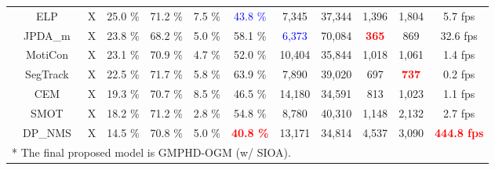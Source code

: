 \documentclass[journal]{IEEEtran}
\begin{document}
\begin{table*}[t]
\begin{tabular}{|c|c|c|ccccccccc|}
            & \footnotesize{ELP~\cite{elp}} &  \footnotesize{X}
            & \footnotesize{25.0 \%} &  \footnotesize{71.2 \%} &  \footnotesize{7.5 \%} &  \footnotesize{\textcolor{blue}{43.8 \%}} &  \footnotesize{7,345} &  \footnotesize{37,344} &  \footnotesize{1,396} &  \footnotesize{1,804} &  \footnotesize{5.7 fps}  \\
            
            &\footnotesize{JPDA\_m~\cite{jpdam}} &  \footnotesize{X}
            & \footnotesize{23.8 \%} &  \footnotesize{68.2 \%} &  \footnotesize{5.0 \%} &  \footnotesize{58.1 \%} &  \footnotesize{\textcolor{blue}{6,373}} &  \footnotesize{70,084} &  \footnotesize{\textbf{\textcolor{red}{365}}} &  \footnotesize{869} &  \footnotesize{32.6 fps}  \\
            
             &\footnotesize{MotiCon~\cite{moticon}} &  \footnotesize{X}
             & \footnotesize{23.1 \%} &  \footnotesize{70.9 \%} &  \footnotesize{4.7 \%} &  \footnotesize{52.0 \%} &  \footnotesize{10,404} &  \footnotesize{35,844} &  \footnotesize{1,018} &  \footnotesize{1,061} &  \footnotesize{1.4 fps}  \\
            
            &\footnotesize{SegTrack~\cite{segtrack}} &  \footnotesize{X}
            & \footnotesize{22.5 \%} &  \footnotesize{71.7 \%} &  \footnotesize{5.8 \%} &  \footnotesize{63.9 \%} &  \footnotesize{7,890} &  \footnotesize{39,020} &  \footnotesize{697} &  \footnotesize{\textbf{\textcolor{red}{737}}} &  \footnotesize{0.2 fps}  \\
            
            & \footnotesize{CEM~\cite{cem}} &  \footnotesize{X}
            & \footnotesize{19.3 \%} &  \footnotesize{70.7 \%} &  \footnotesize{8.5 \%} &  \footnotesize{46.5 \%} &  \footnotesize{14,180} &  \footnotesize{34,591} &  \footnotesize{813} &  \footnotesize{1,023} &  \footnotesize{1.1 fps}  \\
            
            & \footnotesize{SMOT~\cite{smot}} &  \footnotesize{X}
            & \footnotesize{18.2 \%} &  \footnotesize{71.2 \%} &  \footnotesize{2.8 \%} &  \footnotesize{54.8 \%} &  \footnotesize{8,780} &  \footnotesize{40,310} &  \footnotesize{1,148} &  \footnotesize{2,132} &  \footnotesize{2.7 fps}  \\
            
            & \footnotesize{DP\_NMS~\cite{dpnms}} &  \footnotesize{X}
            & \footnotesize{14.5 \%} &  \footnotesize{70.8 \%} &  \footnotesize{5.0 \%} &  \footnotesize{\textbf{\textcolor{red}{40.8 \%}}} &  \footnotesize{13,171} &  \footnotesize{34,814} &  \footnotesize{4,537} &  \footnotesize{3,090} &  \footnotesize{\textbf{\textcolor{red}{444.8 fps}}}  \\
            
            \hline
            \multicolumn{12}{l}{* The final proposed model is GMPHD-OGM (w/ SIOA).} \\
        \end{tabular}

\end{table*}
\end{document}
